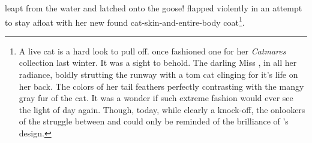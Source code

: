 \noindent
\pixel{} leapt from the water and latched onto the goose!
\goose{} flapped violently in an attempt to stay afloat with her new found
cat-skin-and-entire-body coat\footnote{
A live cat is a hard look to pull off.  \peacockF{} once fashioned
one for her \textit{Catmares} collection last winter.  It was a sight to behold.
The darling Miss \peacock, in all her radiance, boldly strutting the runway
with a tom cat clinging for it's life on her back.  The colors of her tail feathers
perfectly contrasting with the mangy gray fur of the cat.  It was a wonder if
such extreme fashion would ever see the light of day again.
Though, today, while clearly a knock-off, the onlookers of the struggle between
\goose{} and \pixel{} could only be reminded of the brilliance of \peacock's design.
}.


